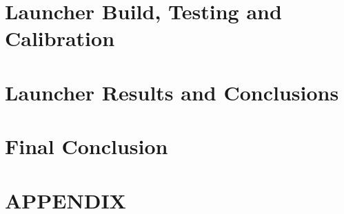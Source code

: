 \clearpage
\section{Launcher Build, Testing and Calibration}
\label{sec:Launcher Build, Testing and Calibration}

\clearpage
\section{Launcher Results and Conclusions}
\label{sec:Launcher Results and Conclusions}

\clearpage
\section{Final Conclusion}
\label{sec:Final Conclusion}

\clearpage
\printbibliography


\clearpage
\section{APPENDIX}
\label{sec:APPENDIX}





